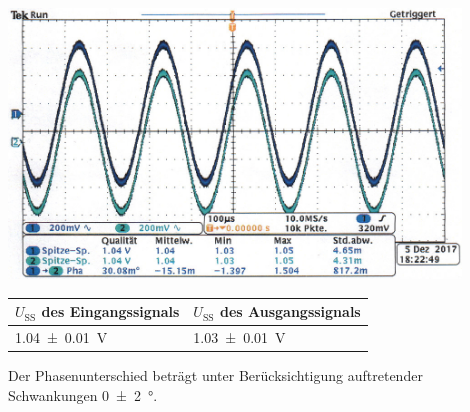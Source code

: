     \begin{center}
        \captionsetup{type=figure}
        \begin{adjustbox}{max width=\linewidth, keepaspectratio}
            \includegraphics[width=120mm]{jpg/Kollektorschaltung-absichtlich-verschoben}
        \end{adjustbox}
        \label{fig:Kollektorschaltung-absichtlich-verschoben}
    \end{center}
\endminipage
%
\par
%
\minipage{\linewidth}
    \begin{center}
        \captionsetup{type=table}
        \begin{adjustbox}{max width=\linewidth, keepaspectratio}
            \begin{tabular}{ll}
            \toprule
            $U_{\text{SS}}$ des Eingangssignals & $U_{\text{SS}}$ des Ausgangssignals \\
            \midrule
            \SI{1,04 \pm 0,01}{\volt}           & \SI{1,03 \pm 0,01}{\volt}           \\
            \bottomrule
            \end{tabular}
        \end{adjustbox}
        \label{tab:OsziKollektorschaltung}
    \end{center}
\endminipage
%
\par
%
Der Phasenunterschied beträgt unter Berücksichtigung auftretender Schwankungen \SI{0 \pm 2}{\degree}.
%
